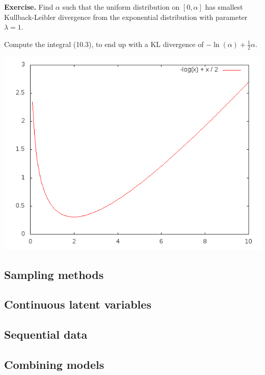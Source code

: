 \documentclass[11pt]{article}
\newenvironment{exercise}{\textbf{Exercise.}}{}
\begin{document}
\begin{exercise}
Find $\alpha$ such that the uniform distribution on $[0, \alpha]$ has smallest
Kullback-Leibler divergence from the exponential distribution with parameter
$\lambda = 1$.
\end{exercise}

Compute the integral (10.3), to end up with a KL divergence of $-\ln(\alpha) +
\frac{1}{2} \alpha$.

\includegraphics[width=.9\linewidth]{kullback-leibler.png}

\subsection{Sampling methods}
\label{sec-1-11}
\subsection{Continuous latent variables}
\label{sec-1-12}
\subsection{Sequential data}
\label{sec-1-13}
\subsection{Combining models}
\label{sec-1-14}
\end{document}
